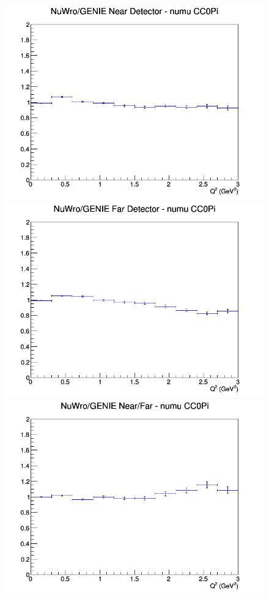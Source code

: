\documentclass[12pt]{article}
\begin{document}
\begin{figure}[h]
\endminipage
\newline
{}
\includegraphics[width=\linewidth]{eff_Q2/FGT/ratios/CC0Pi_NuWro_GENIE_numu_near_Q2.png}
\endminipage
{}
\includegraphics[width=\linewidth]{eff_Q2/FGT/ratios/CC0Pi_NuWro_GENIE_numu_far_Q2.png}
\endminipage
{}
\includegraphics[width=\linewidth]{eff_Q2/FGT/ratios/CC0Pi_NuWro_GENIE_numu_NF_Q2.png}
\endminipage
\newline
\end{figure}
\clearpage
\end{document}
